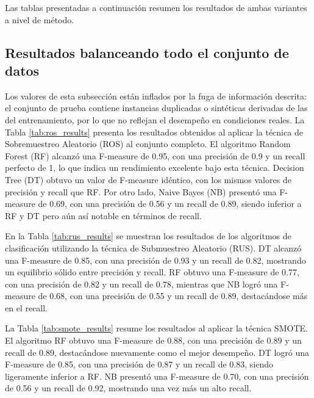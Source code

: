 Las tablas presentadas a continuación resumen los resultados de ambas variantes a nivel de método.

\subsection{Resultados balanceando todo el conjunto de datos}

Los valores de esta subsección están inflados por la fuga de información descrita: el conjunto de prueba contiene instancias duplicadas o sintéticas derivadas de las del entrenamiento, por lo que no reflejan el desempeño en condiciones reales. La Tabla \ref{tab:ros_results} presenta los resultados obtenidos al aplicar la técnica de Sobremuestreo Aleatorio (ROS) al conjunto completo. El algoritmo Random Forest (RF) alcanzó una F-measure de 0.95, con una precisión de 0.9 y un recall perfecto de 1, lo que indica un rendimiento excelente bajo esta técnica. Decision Tree (DT) obtuvo un valor de F-measure idéntico, con los mismos valores de precisión y recall que RF. Por otro lado, Naive Bayes (NB) presentó una F-measure de 0.69, con una precisión de 0.56 y un recall de 0.89, siendo inferior a RF y DT pero aún así notable en términos de recall.





En la Tabla \ref{tab:rus_results} se muestran los resultados de los algoritmos de clasificación utilizando la técnica de Submuestreo Aleatorio (RUS). DT alcanzó una F-measure de 0.85, con una precisión de 0.93 y un recall de 0.82, mostrando un equilibrio sólido entre precisión y recall. RF obtuvo una F-measure de 0.77, con una precisión de 0.82 y un recall de 0.78, mientras que NB logró una F-measure de 0.68, con una precisión de 0.55 y un recall de 0.89, destacándose más en el recall.




La Tabla \ref{tab:smote_results} resume los resultados al aplicar la técnica SMOTE. El algoritmo RF obtuvo una F-measure de 0.88, con una precisión de 0.89 y un recall de 0.89, destacándose nuevamente como el mejor desempeño. DT logró una F-measure de 0.85, con una precisión de 0.87 y un recall de 0.83, siendo ligeramente inferior a RF. NB presentó una F-measure de 0.70, con una precisión de 0.56 y un recall de 0.92, mostrando una vez más un alto recall.




